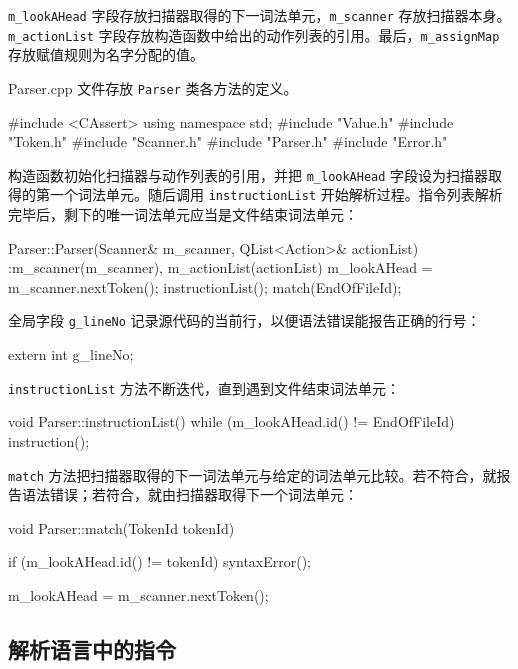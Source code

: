 \texttt{m\_lookAHead} 字段存放扫描器取得的下一词法单元，\texttt{m\_scanner} 存放扫描器本身。\texttt{m\_actionList} 字段存放构造函数中给出的动作列表的引用。最后，\texttt{m\_assignMap} 存放赋值规则为名字分配的值。

Parser.cpp 文件存放 \texttt{Parser} 类各方法的定义。

\medskip{}

\begin{codebox}
#include <CAssert>
using namespace std;
#include "Value.h"
#include "Token.h"
#include "Scanner.h"
#include "Parser.h"
#include "Error.h"
\end{codebox}

构造函数初始化扫描器与动作列表的引用，并把 \texttt{m\_lookAHead} 字段设为扫描器取得的第一个词法单元。随后调用 \texttt{instructionList} 开始解析过程。指令列表解析完毕后，剩下的唯一词法单元应当是文件结束词法单元：

\begin{codebox}
Parser::Parser(Scanner& m_scanner, QList<Action>& actionList)
  :m_scanner(m_scanner),
   m_actionList(actionList) {
  m_lookAHead = m_scanner.nextToken();
  instructionList();
  match(EndOfFileId);
}
\end{codebox}

全局字段 \texttt{g\_lineNo} 记录源代码的当前行，以便语法错误能报告正确的行号：

\begin{codebox}
extern int g_lineNo;
\end{codebox}

\texttt{instructionList} 方法不断迭代，直到遇到文件结束词法单元：

\begin{codebox}
void Parser::instructionList() {
  while (m_lookAHead.id() != EndOfFileId) {
    instruction();
  }
}
\end{codebox}

\texttt{match} 方法把扫描器取得的下一词法单元与给定的词法单元比较。若不符合，就报告语法错误；若符合，就由扫描器取得下一个词法单元：

\begin{codebox}
void Parser::match(TokenId tokenId) {
  if (m_lookAHead.id() != tokenId) {
    syntaxError();
  }

  m_lookAHead = m_scanner.nextToken();
}
\end{codebox}

\subsection{解析语言中的指令}

